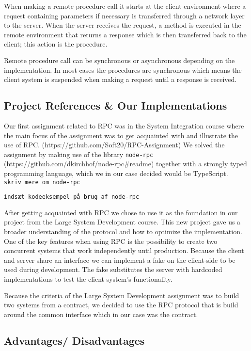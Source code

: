 \documentclass[
]{article}
\begin{document}
When making a remote procedure call it starts at the client environment
where a request containing parameters if necessary is transferred
through a network layer to the server. When the server receives the
request, a method is executed in the remote environment that returns a
response which is then transferred back to the client; this action is
the procedure.

Remote procedure call can be synchronous or asynchronous depending on
the implementation. In most cases the procedures are synchronous which
means the client system is suspended when making a request until a
response is received.

\hypertarget{project-references-our-implementations}{%
\subsection{Project References \& Our
Implementations}\label{project-references-our-implementations}}

Our first assignment related to RPC was in the System Integration course
where the main focus of the assignment was to get acquainted with and
illustrate the use of RPC. (https://github.com/Soft20/RPC-Assignment) We
solved the assignment by making use of the library \texttt{node-rpc}
(https://github.com/dkirchhof/node-rpc\#readme) together with a strongly
typed programming language, which we in our case decided would be
TypeScript. \texttt{skriv\ mere\ om\ node-rpc}

\texttt{indsæt\ kodeeksempel\ på\ brug\ af\ node-rpc}

After getting acquainted with RPC we chose to use it as the foundation
in our project from the Large System Development course. This new
project gave us a broader understanding of the protocol and how to
optimize the implementation. One of the key features when using RPC is
the possibility to create two concurrent systems that work independently
until production. Because the client and server share an interface we
can implement a fake on the client-side to be used during development.
The fake substitutes the server with hardcoded implementations to test
the client system's functionality.

Because the criteria of the Large System Development assignment was to
build two systems from a contract, we decided to use the RPC protocol
that is build around the common interface which in our case was the
contract.

\hypertarget{advantages-disadvantages}{%
\subsection{Advantages/ Disadvantages}\label{advantages-disadvantages}}
\end{document}
